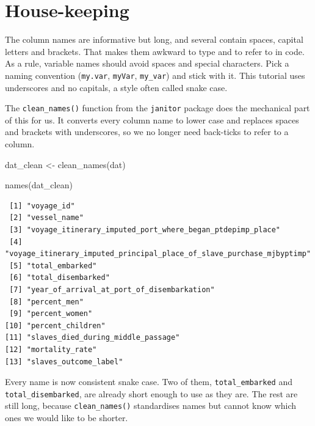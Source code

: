 \documentclass[
  english,
  letterpaper,
]{book}
\newenvironment{Shaded}{\begin{snugshade}}{\end{snugshade}}
\newcommand{\FunctionTok}[1]{\textcolor[rgb]{0.28,0.35,0.67}{#1}}
\newcommand{\NormalTok}[1]{\textcolor[rgb]{0.00,0.23,0.31}{#1}}
\newcommand{\OtherTok}[1]{\textcolor[rgb]{0.00,0.23,0.31}{#1}}
\begin{document}
\section{House-keeping}\label{house-keeping}

The column names are informative but long, and several contain spaces,
capital letters and brackets. That makes them awkward to type and to
refer to in code. As a rule, variable names should avoid spaces and
special characters. Pick a naming convention (\texttt{my.var},
\texttt{myVar}, \texttt{my\_var}) and stick with it. This tutorial uses
underscores and no capitals, a style often called snake case.

The \texttt{clean\_names()} function from the \texttt{janitor} package
does the mechanical part of this for us. It converts every column name
to lower case and replaces spaces and brackets with underscores, so we
no longer need back-ticks to refer to a column.

\begin{Shaded}
\begin{Highlighting}[]
\NormalTok{dat\_clean }\OtherTok{\textless{}{-}} \FunctionTok{clean\_names}\NormalTok{(dat)}

\FunctionTok{names}\NormalTok{(dat\_clean)}
\end{Highlighting}
\end{Shaded}

\begin{verbatim}
 [1] "voyage_id"                                                           
 [2] "vessel_name"                                                         
 [3] "voyage_itinerary_imputed_port_where_began_ptdepimp_place"            
 [4] "voyage_itinerary_imputed_principal_place_of_slave_purchase_mjbyptimp"
 [5] "total_embarked"                                                      
 [6] "total_disembarked"                                                   
 [7] "year_of_arrival_at_port_of_disembarkation"                           
 [8] "percent_men"                                                         
 [9] "percent_women"                                                       
[10] "percent_children"                                                    
[11] "slaves_died_during_middle_passage"                                   
[12] "mortality_rate"                                                      
[13] "slaves_outcome_label"                                                
\end{verbatim}

Every name is now consistent snake case. Two of them,
\texttt{total\_embarked} and \texttt{total\_disembarked}, are already
short enough to use as they are. The rest are still long, because
\texttt{clean\_names()} standardises names but cannot know which ones we
would like to be shorter.
\end{document}

